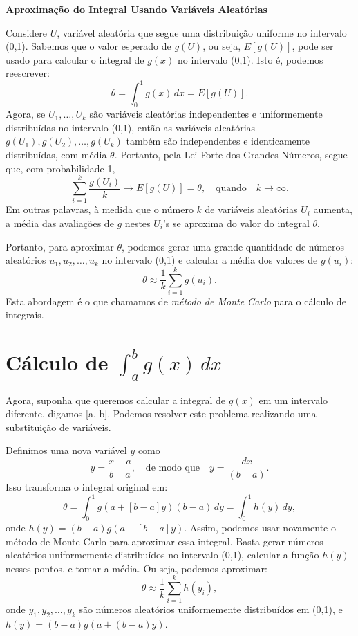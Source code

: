 \documentclass[
]{book}
\begin{document}
\textbf{Aproximação do Integral Usando Variáveis Aleatórias}

Considere \(U\), variável aleatória que segue uma distribuição uniforme no
intervalo (0,1). Sabemos que o valor esperado de \(g(U)\), ou seja,
\(E[g(U)]\), pode ser usado para calcular o integral de \(g(x)\) no
intervalo (0,1). Isto é, podemos reescrever:
\[\theta = \int_{0}^{1}g(x)\,dx = E[g(U)].\] Agora, se \(U_1,\ldots,U_k\)
são variáveis aleatórias independentes e uniformemente distribuídas no
intervalo (0,1), então as variáveis aleatórias
\(g(U_1),g(U_2),\ldots,g(U_k)\) também são independentes e identicamente
distribuídas, com média \(\theta\). Portanto, pela Lei Forte dos Grandes
Números, segue que, com probabilidade 1,
\[\sum_{i=1}^{k}\frac{g(U_i)}{k} \longrightarrow E[g(U)]=\theta, \quad \text{quando} \quad k\rightarrow \infty.\]
Em outras palavras, à medida que o número \(k\) de variáveis aleatórias
\(U_i\) aumenta, a média das avaliações de \(g\) nestes \(U_i\)'s se aproxima
do valor do integral \(\theta\).

Portanto, para aproximar \(\theta\), podemos gerar uma grande quantidade
de números aleatórios \(u_1, u_2, \ldots, u_k\) no intervalo (0,1) e
calcular a média dos valores de \(g(u_i)\):
\[\theta \approx \frac{1}{k}\sum_{i=1}^{k}g(u_i).\] Esta abordagem é o
que chamamos de \emph{método de Monte Carlo} para o cálculo de integrais.

\section{\texorpdfstring{Cálculo de \(\int_{a}^{b}g(x)\, dx\)}{Cálculo de \textbackslash int\_\{a\}\^{}\{b\}g(x)\textbackslash, dx}}\label{cuxe1lculo-de-int_abgx-dx}

Agora, suponha que queremos calcular a integral de \(g(x)\) em um
intervalo diferente, digamos {[}a, b{]}. Podemos resolver este problema
realizando uma substituição de variáveis.

Definimos uma nova variável \(y\) como
\[y=\frac{x-a}{b-a}, \quad \text{de modo que} \quad y = \frac{dx}{(b-a)}.\]
Isso transforma o integral original em:
\[\theta = \int_{0}^{1}g(a+[b-a]y)(b-a)\,dy = \int_{0}^{1}h(y)\,dy,\]
onde \(h(y) = (b-a)g(a+[b-a]y)\). Assim, podemos usar novamente o método
de Monte Carlo para aproximar essa integral. Basta gerar números
aleatórios uniformemente distribuídos no intervalo (0,1), calcular a
função \(h(y)\) nesses pontos, e tomar a média. Ou seja, podemos
aproximar: \[
\theta \approx \frac{1}{k} \sum_{i=1}^{k} h(y_i),
\] onde \(y_1, y_2, \ldots, y_k\) são números aleatórios uniformemente
distribuídos em (0,1), e \(h(y) = (b - a)g(a + (b - a)y)\).
\end{document}
